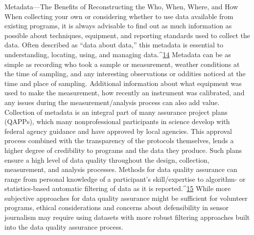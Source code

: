 Metadata—The Benefits of Reconstructing the
Who, When, Where, and How
When collecting your own or considering whether to use data available
from existing programs, it is always advisable to find out as much information
as possible about techniques, equipment, and reporting standards used
to collect the data. Often described as ``data about data,'' this metadata is
essential to understanding, locating, using, and managing data.^{\href{#endnotes-stauffer}{14}} Metadata
can be as simple as recording who took a sample or measurement, weather
conditions at the time of sampling, and any interesting observations or oddities
noticed at the time and place of sampling. Additional information
about what equipment was used to make the measurement, how recently an
instrument was calibrated, and any issues during the measurement/analysis
process can also add value.
Collection of metadata is an integral part of many assurance project plans
(QAPPs), which many nonprofessional participants in science develop with
federal agency guidance and have approved by local agencies. This approval
process combined with the transparency of the protocols themselves, lends
a higher degree of credibility to programs and the data they produce. Such
plans ensure a high level of data quality throughout the design, collection,
measurement, and analysis processes. Methods for data quality assurance
can range from personal knowledge of a participant's skill/expertise to
algorithm- or statistics-based automatic filtering of data as it is reported.^{\href{#endnotes-stauffer}{15}}
While more subjective approaches for data quality assurance might be sufficient
for volunteer programs, ethical considerations and concerns about
defensibility in sensor journalism may require using datasets with more
robust filtering approaches built into the data quality assurance process.

